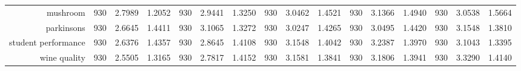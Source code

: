 \begin{table}[H]
{\begin{tabular}{rccccccccccccccc}
			mushroom                            & 930                                     & \cellcolor[rgb]{ .776,  .937,  .808}\textcolor[rgb]{ 0,  .38,  0}{2.7989}          & 1.2052          & 930                             & 2.9441                                                                    & 1.3250          & 930                             & 3.0462          & 1.4521          & 930                             & 3.1366                                                                    & 1.4940          & 930                             & 3.0538                                                                    & 1.5664          \\
			parkinsons                          & 930                                     & \cellcolor[rgb]{ .776,  .937,  .808}\textcolor[rgb]{ 0,  .38,  0}{2.6645}          & 1.4411          & 930                             & 3.1065                                                                    & 1.3272          & 930                             & 3.0247          & 1.4265          & 930                             & 3.0495                                                                    & 1.4420          & 930                             & 3.1548                                                                    & 1.3810          \\
			student performance                 & 930                                     & \cellcolor[rgb]{ .776,  .937,  .808}\textcolor[rgb]{ 0,  .38,  0}{2.6376}          & 1.4357          & 930                             & 2.8645                                                                    & 1.4108          & 930                             & 3.1548          & 1.4042          & 930                             & 3.2387                                                                    & 1.3970          & 930                             & 3.1043                                                                    & 1.3395          \\
			wine quality                        & 930                                     & \cellcolor[rgb]{ .776,  .937,  .808}\textcolor[rgb]{ 0,  .38,  0}{2.5505}          & 1.3165          & 930                             & 2.7817                                                                    & 1.4152          & 930                             & 3.1581          & 1.3841          & 930                             & 3.1806                                                                    & 1.3941          & 930                             & 3.3290                                                                    & 1.4140          \\

\end{tabular}}
\end{table}
